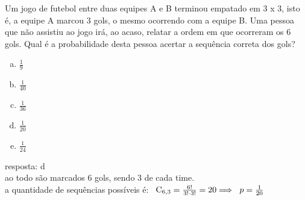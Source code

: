 \begin{ex}
 Um jogo de futebol entre duas equipes A e B terminou empatado em 3 x 3, isto é, a equipe A marcou 3 gols, o mesmo ocorrendo com a equipe B. Uma pessoa que não assistiu ao jogo irá, ao acaso, relatar a ordem em que ocorreram os 6 gols. Qual é a probabilidade desta pessoa acertar a sequência correta dos gols?
    \begin{enumerate}[(a)]
    \item $\frac{1}{9}$
    \item $\frac{1}{40}$
    \item $\frac{1}{36}$
    \item $\frac{1}{20}$
    \item $\frac{1}{24}$
    \end{enumerate}
      \begin{sol}
      resposta: d \\
      ao todo são marcados 6 gols, sendo 3 de cada time.\\
      a quantidade de sequências possíveis é:$\hspace{0.3cm}\mathrm{C}_{6,3}=\frac{6!}{3!\cdot3!}=20 \Longrightarrow\hspace{0,2cm}p=\frac{1}{20}$
      \end{sol}
\end{ex}